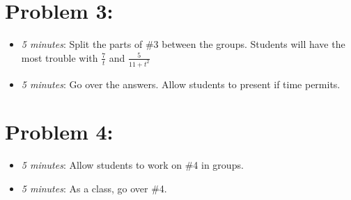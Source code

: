 \documentclass[handout,nooutcomes]{ximera}
\begin{document}
	
	
\section*{Problem 3:}

	\begin{itemize}
	
	\item  \emph{5 minutes}:  Split the parts of \#3 between the groups.  Students will have the most trouble with $\frac{7}{t}$ and $\frac{5}{11+t^2}$  
	
	\item  \emph{5 minutes}:  Go over the answers. Allow students to present if time permits.
	
	\end{itemize}
	


\section*{Problem 4:}

	\begin{itemize}
	
	\item  \emph{5 minutes}:  Allow students to work on \#4 in groups.  
		
	\item  \emph{5 minutes}:  As a class, go over \#4.
	\end{itemize}	
	
	
	

	
	

	
	
	

	
	
	
\end{document}
